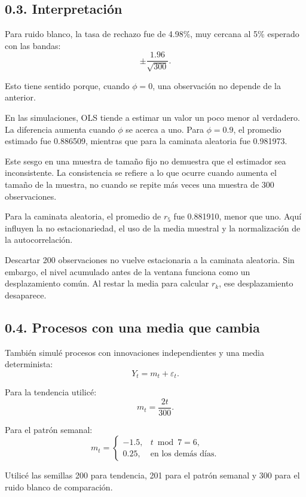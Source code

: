 \documentclass[11pt,letterpaper]{article}
\begin{document}
\subsection*{0.3. Interpretación}

Para ruido blanco, la tasa de rechazo fue de 4.98\%, muy cercana al 5\% esperado con las bandas:
\[
\pm\frac{1.96}{\sqrt{300}}.
\]

Esto tiene sentido porque, cuando $\phi=0$, una observación no depende de la anterior.

En las simulaciones, OLS tiende a estimar un valor un poco menor al verdadero. La diferencia aumenta cuando $\phi$ se acerca a uno. Para $\phi=0.9$, el promedio estimado fue 0.886509, mientras que para la caminata aleatoria fue 0.981973.

Este sesgo en una muestra de tamaño fijo no demuestra que el estimador sea inconsistente. La consistencia se refiere a lo que ocurre cuando aumenta el tamaño de la muestra, no cuando se repite más veces una muestra de 300 observaciones.

Para la caminata aleatoria, el promedio de $r_5$ fue 0.881910, menor que uno. Aquí influyen la no estacionariedad, el uso de la media muestral y la normalización de la autocorrelación.

Descartar 200 observaciones no vuelve estacionaria a la caminata aleatoria. Sin embargo, el nivel acumulado antes de la ventana funciona como un desplazamiento común. Al restar la media para calcular $r_k$, ese desplazamiento desaparece.

\subsection*{0.4. Procesos con una media que cambia}

También simulé procesos con innovaciones independientes y una media determinista:
\[
Y_t=m_t+\varepsilon_t.
\]

Para la tendencia utilicé:
\[
m_t=\frac{2t}{300}.
\]

Para el patrón semanal:
\[
m_t=
\begin{cases}
-1.5, & t\bmod7=6,\\
0.25, & \text{en los demás días}.
\end{cases}
\]

Utilicé las semillas 200 para tendencia, 201 para el patrón semanal y 300 para el ruido blanco de comparación.
\end{document}
